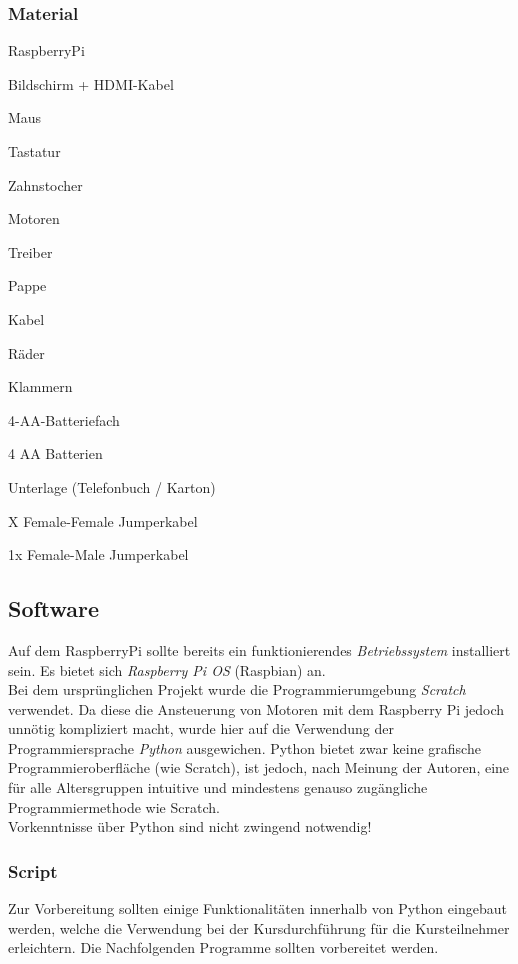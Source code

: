 \subsubsection{Material}
\begin{checklist}
    \item RaspberryPi
    \item Bildschirm + HDMI-Kabel
    \item Maus
    \item Tastatur
    \item Zahnstocher
    \item Motoren
    \item Treiber
    \item Pappe
    \item Kabel
    \item Räder
    \item Klammern
    \item 4-AA-Batteriefach
    \item 4 AA Batterien
    \item Unterlage (Telefonbuch / Karton)
    \item X Female-Female Jumperkabel
    \item 1x Female-Male Jumperkabel
\end{checklist}


\subsection{Software}
Auf dem RaspberryPi sollte bereits ein funktionierendes \emph{Betriebssystem} installiert sein. Es bietet sich \emph{Raspberry Pi OS} (Raspbian) an. \\

Bei dem ursprünglichen Projekt wurde die Programmierumgebung \emph{Scratch} verwendet. Da diese die Ansteuerung von Motoren mit dem Raspberry Pi jedoch unnötig kompliziert macht, wurde hier auf die Verwendung der Programmiersprache \emph{Python} ausgewichen. Python bietet zwar keine grafische Programmieroberfläche (wie Scratch), ist jedoch, nach Meinung der Autoren, eine für alle Altersgruppen intuitive und mindestens genauso zugängliche Programmiermethode wie Scratch.\\

Vorkenntnisse über Python sind nicht zwingend notwendig!

\subsubsection{Script}
Zur Vorbereitung sollten einige Funktionalitäten innerhalb von Python eingebaut werden, welche die Verwendung bei der Kursdurchführung für die Kursteilnehmer erleichtern. Die Nachfolgenden Programme sollten vorbereitet werden.\\

